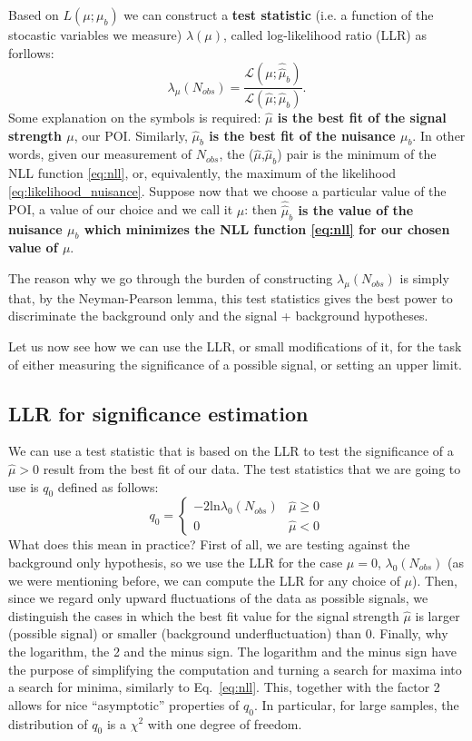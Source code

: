 \documentclass[a4paper,12pt]{article}
\begin{document}
Based on $L(\mu;\mu_b)$ we can construct a {\bf test statistic} (i.e. a
function of the stocastic variables we measure) $\lambda(\mu)$,
called log-likelihood ratio (LLR) as
forllows:
\begin{equation}
\lambda_\mu(N_{obs})=\frac{\mathcal{L}(\mu;\hat{\hat{\mu}}_b)}{\mathcal{L}(\hat{\mu};\hat{\mu}_b)}.
\label{eq:llr}
\end{equation}
Some explanation on the symbols is required:  {\bf $\hat{\mu}$ is the best fit of
the signal strength $\mu$}, our POI. Similarly, {\bf $\hat{\mu}_b$ is the best fit
of the nuisance $\mu_b$}. In other words, given our measurement of $N_{obs}$,
the ($\hat{\mu}$,$\hat{\mu}_b$) pair is the
minimum of the NLL function \ref{eq:nll}, or, equivalently, the maximum of the
likelihood \ref{eq:likelihood_nuisance}. Suppose now that we choose a
particular value of the POI, a value of our choice and we call it $\mu$: then
{\bf $\hat{\hat{\mu}}_b$ is the value of the nuisance $\mu_b$ which minimizes the
NLL function \ref{eq:nll} for our chosen value of $\mu$}.

The reason why we go through the burden of constructing $\lambda_\mu(N_{obs})$
is simply that, by the Neyman-Pearson lemma, this test statistics gives the
best power to discriminate the background only and the signal + background
hypotheses.

Let us now see how we can use the LLR, or small modifications of it, for the
task of either measuring the significance of a possible signal, or setting an
upper limit.

\subsection{LLR for significance estimation}
We can use a test statistic that is based on the LLR to test the significance
of a $\hat{\mu}>0$ result from the best fit of our data. The test statistics
that we are going to use is $q_{0}$ defined as follows:
\begin{equation}
q_0=\begin{cases}
-2\mathrm{ln}\lambda_0(N_{obs}) & \hat{\mu}\geq0 \\
0 & \hat{\mu}<0
\end{cases}
\label{eq:teststat_signif}
\end{equation}
What does this mean in practice? First of all, we are testing against the
background only hypothesis, so we use the LLR for the case $\mu=0$,
$\lambda_0(N_{obs})$ (as we were mentioning before, we can compute the LLR for
any choice of $\mu$).
Then, since we regard only upward fluctuations of the data as possible
signals, we distinguish the cases in which the best fit value for the signal
strength $\hat{\mu}$ is larger (possible signal) or smaller (background
underfluctuation) than 0. Finally, why the logarithm, the 2 and the minus
sign. The logarithm and the minus sign have the purpose of simplifying the
computation and turning a search for maxima into a search for minima,
similarly to Eq.~\ref{eq:nll}. This, together with the factor 2 allows for
nice ``asymptotic'' properties of $q_0$. In particular, for large samples, the
distribution of $q_0$ is a $\chi{}^2$ with one degree of freedom.
\end{document}
